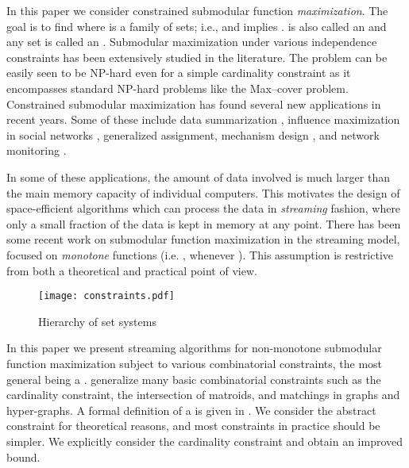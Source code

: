 \documentclass[oneside,letterpaper]{scrartcl} \usepackage{macros}
\begin{document}
In this paper we consider constrained submodular function
\emph{maximization}. The goal is to find  where  is a
 family of sets; i.e., 
and  implies .  is
also called an  and any set  is called an . Submodular
maximization under various independence constraints has been
extensively studied in the literature. The problem can be easily seen
to be NP-hard even for a simple cardinality constraint as it
encompasses standard NP-hard problems like the Max--cover
problem. Constrained submodular maximization has found several new
applications in recent years. Some of these include data summarization
\cite{hb-11,sssj-12,dkr-13}, influence maximization in social networks
\cite{kkt-03,cyy-09,ccy-10,gfl-11,ss-13}, generalized
assignment\cite{ccpv-07}, mechanism design \cite{bik-07}, and network
monitoring \cite{lkgfvg-07}.

In some of these applications, the amount of data involved is much
larger than the main memory capacity of individual computers. This
motivates the design of space-efficient algorithms which can process
the data in \textit{streaming} fashion, where only a small fraction of
the data is kept in memory at any point. There has been some recent
work on submodular function maximization in the streaming model,
focused on \emph{monotone} functions (i.e. , whenever
). This assumption is restrictive from both a
theoretical and practical point of view.

\begin{wrapfigure}{r}{.45\textwidth}
\centering
  \texttt{[image: constraints.pdf]}
\caption{Hierarchy of set systems}
\end{wrapfigure}
In this paper we present streaming algorithms for non-monotone
submodular function maximization subject to various combinatorial
constraints, the most general being a .
 generalize many basic
combinatorial constraints such as the cardinality constraint, the
intersection of  matroids, and matchings in graphs and
hyper-graphs.  A formal definition of a  is given in
. We consider the abstract
 constraint for theoretical reasons, and most
constraints in practice should be simpler. We explicitly consider the
cardinality constraint and obtain an improved bound.
\end{document}
